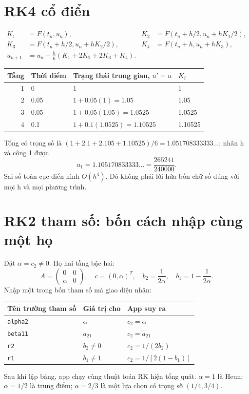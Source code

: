 \section{RK4 cổ điển}
\label{sec:ode-rk4}
\begin{align*}
K_1&=F(t_n,u_n),&K_2&=F(t_n+h/2,u_n+hK_1/2),\\
K_3&=F(t_n+h/2,u_n+hK_2/2),&K_4&=F(t_n+h,u_n+hK_3),\\
u_{n+1}&=u_n+\frac h6(K_1+2K_2+2K_3+K_4).
\end{align*}
\begin{center}\begin{tabular}{rlll}
\toprule Tầng&Thời điểm&Trạng thái trung gian, $u'=u$&$K_i$\\\midrule
1&0&1&1\\
2&0.05&$1+0.05(1)=1.05$&1.05\\
3&0.05&$1+0.05(1.05)=1.0525$&1.0525\\
4&0.1&$1+0.1(1.0525)=1.10525$&1.10525\\\bottomrule
\end{tabular}\end{center}
Tổng có trọng số là $(1+2.1+2.105+1.10525)/6=1.051708333333\ldots$; nhân h và cộng 1 được
\[
u_1=1.105170833333\ldots=\frac{265241}{240000}.
\]
Sai số toàn cục điển hình $O(h^4)$. Đó không phải lời hứa bốn chữ số đúng với mọi h và mọi phương trình.

\section{RK2 tham số: bốn cách nhập cùng một họ}
\label{sec:ode-rk2-parameter}
Đặt $\alpha=c_2\ne0$. Họ hai tầng bậc hai:
\[
A=\begin{pmatrix}0&0\\\alpha&0\end{pmatrix},\quad
c=(0,\alpha)^T,\quad b_2=\frac1{2\alpha},\quad b_1=1-\frac1{2\alpha}.
\]
Nhập một trong bốn tham số mà giao diện nhận:
\begin{center}\begin{tabular}{lll}
\toprule Tên trường tham số&Giá trị cho&App suy ra\\\midrule
\texttt{alpha2}&$\alpha$&$c_2=\alpha$\\
\texttt{beta11}&$a_{21}$&$c_2=a_{21}$\\
\texttt{r2}&$b_2\ne0$&$c_2=1/(2b_2)$\\
\texttt{r1}&$b_1\ne1$&$c_2=1/[2(1-b_1)]$\\\bottomrule
\end{tabular}\end{center}
Sau khi lập bảng, app chạy cùng thuật toán RK hiện tổng quát. $\alpha=1$ là Heun; $\alpha=1/2$ là trung điểm; $\alpha=2/3$ là một lựa chọn có trọng số $(1/4,3/4)$.

